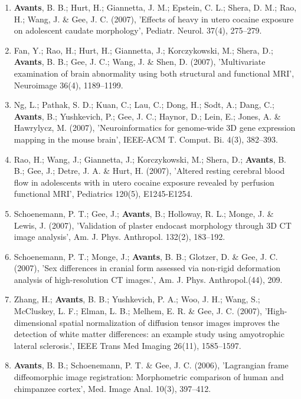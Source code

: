 \documentclass[11pt]{moderncv} %
\begin{document}
\begin{enumerate}
\item  \textbf{Avants}, B. B.; Hurt, H.; Giannetta, J. M.; Epstein, C. L.; Shera, D. M.; Rao, H.; Wang, J. \&  Gee, J. C. (2007), 'Effects of heavy in utero cocaine exposure on adolescent caudate morphology', Pediatr. Neurol. 37(4), 275--279.

\item  Fan, Y.; Rao, H.; Hurt, H.; Giannetta, J.; Korczykowski, M.; Shera, D.; \textbf{Avants}, B. B.; Gee, J. C.; Wang, J. \&  Shen, D. (2007), 'Multivariate examination of brain abnormality using both structural and functional MRI', Neuroimage 36(4), 1189--1199.

\item  Ng, L.; Pathak, S. D.; Kuan, C.; Lau, C.; Dong, H.; Sodt, A.; Dang, C.; \textbf{Avants}, B.; Yushkevich, P.; Gee, J. C.; Haynor, D.; Lein, E.; Jones, A. \&  Hawrylycz, M. (2007), 'Neuroinformatics for genome-wide 3D gene expression mapping in the mouse brain', IEEE-ACM T. Comput. Bi. 4(3), 382--393.

\item  Rao, H.; Wang, J.; Giannetta, J.; Korczykowski, M.; Shera, D.; \textbf{Avants}, B. B.; Gee, J.; Detre, J. A. \&  Hurt, H. (2007), 'Altered resting cerebral blood flow in adolescents with in utero cocaine exposure revealed by perfusion functional MRI', Pediatrics 120(5), E1245-E1254.

\item  Schoenemann, P. T.; Gee, J.; \textbf{Avants}, B.; Holloway, R. L.; Monge, J. \&  Lewis, J. (2007), 'Validation of plaster endocast morphology through 3D CT image analysis', Am. J. Phys. Anthropol. 132(2), 183--192.

\item  Schoenemann, P. T.; Monge, J.; \textbf{Avants}, B. B.; Glotzer, D. \&  Gee, J. C. (2007), 'Sex differences in cranial form assessed via non-rigid deformation analysis of high-resolution CT images.', Am. J. Phys. Anthropol.(44), 209.

\item  Zhang, H.; \textbf{Avants}, B. B.; Yushkevich, P. A.; Woo, J. H.; Wang, S.; McCluskey, L. F.; Elman, L. B.; Melhem, E. R. \&  Gee, J. C. (2007), 'High-dimensional spatial normalization of diffusion tensor images improves the detection of white matter differences: an example study using amyotrophic lateral sclerosis.', IEEE Trans Med Imaging 26(11), 1585--1597.

\item  \textbf{Avants}, B. B.; Schoenemann, P. T. \&  Gee, J. C. (2006), 'Lagrangian frame diffeomorphic image registration: Morphometric comparison of human and chimpanzee cortex', Med. Image Anal. 10(3), 397--412.


\end{enumerate}
\end{document}
